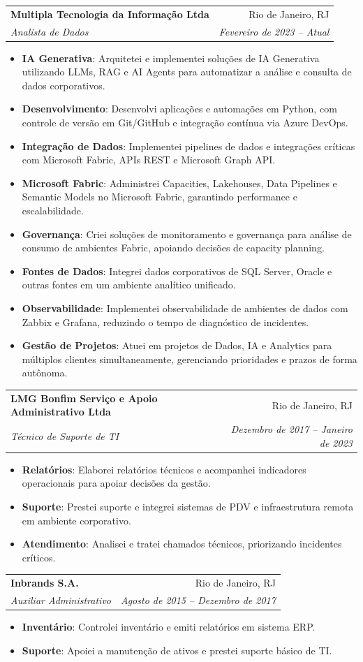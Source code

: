 \documentclass[letterpaper,11pt]{article}
\makeatletter
\newcommand{\resumeItem}[2]{
  \item\small{
    \textbf{#1}{: #2 \vspace{-2pt}}
  }
}
\newcommand{\resumeSubheading}[4]{
  \vspace{-1pt}\item
    \begin{tabular*}{0.97\textwidth}[t]{l@{\extracolsep{\fill}}r}
      \textbf{#1} & #2 \\
      \textit{\small#3} & \textit{\small #4} \\
    \end{tabular*}\vspace{-5pt}
}
\newcommand{\resumeItemListStart}{\begin{itemize}}
\newcommand{\resumeItemListEnd}{\end{itemize}\vspace{-5pt}}
\makeatother
\begin{document}
    \resumeSubheading
      {Multipla Tecnologia da Informação Ltda}{Rio de Janeiro, RJ}
      {Analista de Dados}{Fevereiro de 2023 -- Atual}
      \resumeItemListStart
        \resumeItem{IA Generativa}
          {Arquitetei e implementei soluções de IA Generativa utilizando LLMs, RAG e AI Agents para automatizar a análise e consulta de dados corporativos.}
        \resumeItem{Desenvolvimento}
          {Desenvolvi aplicações e automações em Python, com controle de versão em Git/GitHub e integração contínua via Azure DevOps.}
        \resumeItem{Integração de Dados}
          {Implementei pipelines de dados e integrações críticas com Microsoft Fabric, APIs REST e Microsoft Graph API.}
        \resumeItem{Microsoft Fabric}
          {Administrei Capacities, Lakehouses, Data Pipelines e Semantic Models no Microsoft Fabric, garantindo performance e escalabilidade.}
        \resumeItem{Governança}
          {Criei soluções de monitoramento e governança para análise de consumo de ambientes Fabric, apoiando decisões de capacity planning.}
        \resumeItem{Fontes de Dados}
          {Integrei dados corporativos de SQL Server, Oracle e outras fontes em um ambiente analítico unificado.}
        \resumeItem{Observabilidade}
          {Implementei observabilidade de ambientes de dados com Zabbix e Grafana, reduzindo o tempo de diagnóstico de incidentes.}
        \resumeItem{Gestão de Projetos}
          {Atuei em projetos de Dados, IA e Analytics para múltiplos clientes simultaneamente, gerenciando prioridades e prazos de forma autônoma.}
      \resumeItemListEnd

    \resumeSubheading
      {LMG Bonfim Serviço e Apoio Administrativo Ltda}{Rio de Janeiro, RJ}
      {Técnico de Suporte de TI}{Dezembro de 2017 -- Janeiro de 2023}
      \resumeItemListStart
        \resumeItem{Relatórios}
          {Elaborei relatórios técnicos e acompanhei indicadores operacionais para apoiar decisões da gestão.}
        \resumeItem{Suporte}
          {Prestei suporte e integrei sistemas de PDV e infraestrutura remota em ambiente corporativo.}
        \resumeItem{Atendimento}
          {Analisei e tratei chamados técnicos, priorizando incidentes críticos.}
      \resumeItemListEnd

    \resumeSubheading
      {Inbrands S.A.}{Rio de Janeiro, RJ}
      {Auxiliar Administrativo}{Agosto de 2015 -- Dezembro de 2017}
      \resumeItemListStart
        \resumeItem{Inventário}
          {Controlei inventário e emiti relatórios em sistema ERP.}
        \resumeItem{Suporte}
          {Apoiei a manutenção de ativos e prestei suporte básico de TI.}
      \resumeItemListEnd
\end{document}
